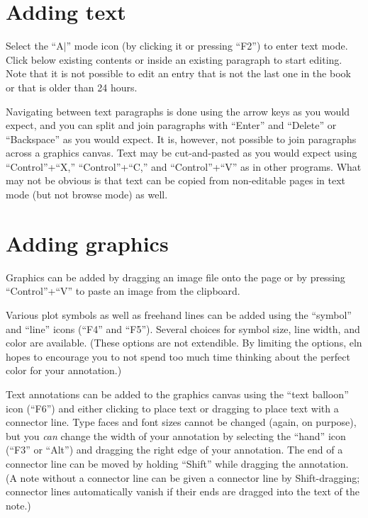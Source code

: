 \documentclass[11pt]{report}
\begin{document}
\section{Adding text}

Select the ``A\hbox{$|$}'' mode icon (by clicking it or
pressing ``F2'') to enter text mode. Click below existing contents or
inside an existing paragraph to start editing. Note that it is not
possible to edit an entry that is not the last one in the book or that
is older than 24 hours.

Navigating between text paragraphs is done using the arrow keys as you
would expect, and you can split and join paragraphs with ``Enter'' and
``Delete'' or ``Backspace'' as you would expect. It is, however, not
possible to join paragraphs across a graphics canvas. Text may be
cut-and-pasted as you would expect using ``Control''+``X,''
``Control''+``C,'' and ``Control''+``V'' as in other programs. What
may not be obvious is that text can be copied from non-editable pages
in text mode (but not browse mode) as well.

\section{Adding graphics}

Graphics can be added by dragging an image file onto the page or by
pressing ``Control''+``V'' to paste an image from the
clipboard. 

Various plot symbols as well as freehand lines can be added using the
``symbol'' and ``line'' icons (``F4'' and ``F5''). Several choices for
symbol size, line width, and color are available.  (These options
are not extendible. By limiting the options,
eln hopes to encourage you to not spend too much time thinking about
the perfect color for your annotation.)

Text annotations can be added to the graphics canvas using the ``text
balloon'' icon (``F6'') and either clicking to place text or dragging
to place text with a connector line. Type faces and font sizes cannot
be changed (again, on purpose), but you \emph{can} change the width of
your annotation by selecting the ``hand'' icon (``F3'' or ``Alt'') and
dragging the right edge of your annotation. The end of a connector
line can be moved by holding ``Shift'' while dragging the
annotation. (A note without a connector line can be given a connector
line by Shift-dragging; connector lines automatically vanish if their ends
are dragged into the text of the note.)
\end{document}
